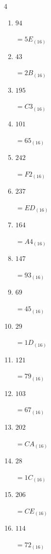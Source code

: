 \begin{multicols}{4}
\begin{enumerate}
        $=5D_{(16)}$

  \item $94$

        $=5E_{(16)}$

  \item $43$

        $=2B_{(16)}$

  \item $195$

        $=C3_{(16)}$

  \item $101$

        $=65_{(16)}$

  \item $242$

        $=F2_{(16)}$

  \item $237$

        $=ED_{(16)}$

  \item $164$

        $=A4_{(16)}$

  \item $147$

        $=93_{(16)}$

  \item $69$

        $=45_{(16)}$

  \item $29$

        $=1D_{(16)}$

  \item $121$

        $=79_{(16)}$

  \item $103$

        $=67_{(16)}$

  \item $202$

        $=CA_{(16)}$

\columnbreak %

  \item $28$

        $=1C_{(16)}$

  \item $206$

        $=CE_{(16)}$

  \item $114$

        $=72_{(16)}$


\end{enumerate}
\end{multicols}
